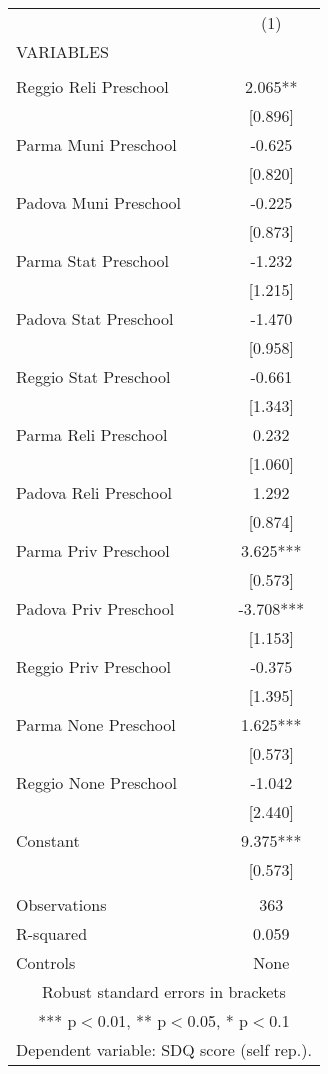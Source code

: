 \begin{tabular}{lc} \hline
 & (1) \\
VARIABLES &  \\ \hline
 &  \\
Reggio Reli Preschool & 2.065** \\
 & [0.896] \\
Parma Muni Preschool & -0.625 \\
 & [0.820] \\
Padova Muni Preschool & -0.225 \\
 & [0.873] \\
Parma Stat Preschool & -1.232 \\
 & [1.215] \\
Padova Stat Preschool & -1.470 \\
 & [0.958] \\
Reggio Stat Preschool & -0.661 \\
 & [1.343] \\
Parma Reli Preschool & 0.232 \\
 & [1.060] \\
Padova Reli Preschool & 1.292 \\
 & [0.874] \\
Parma Priv Preschool & 3.625*** \\
 & [0.573] \\
Padova Priv Preschool & -3.708*** \\
 & [1.153] \\
Reggio Priv Preschool & -0.375 \\
 & [1.395] \\
Parma None Preschool & 1.625*** \\
 & [0.573] \\
Reggio None Preschool & -1.042 \\
 & [2.440] \\
Constant & 9.375*** \\
 & [0.573] \\
 &  \\
Observations & 363 \\
R-squared & 0.059 \\
 Controls & None \\ \hline
\multicolumn{2}{c}{ Robust standard errors in brackets} \\
\multicolumn{2}{c}{ *** p$<$0.01, ** p$<$0.05, * p$<$0.1} \\
\multicolumn{2}{c}{ Dependent variable: SDQ score (self rep.).} \\
\end{tabular}
